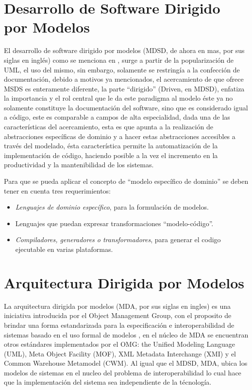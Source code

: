 \section{Desarrollo de Software Dirigido por Modelos}
\label{sec:mdsd}
El desarrollo de software dirigido por modelos (MDSD, de ahora en mas, por sus
siglas en inglés) como se menciona en \cite{mdsd} , surge a partir de la popularización de UML,
el uso del mismo, sin embargo, solamente se restringía a la confección de
documentación, debido a motivos ya mencionados, el acercamiento de que ofrece
MSDS es enteramente diferente, la parte ``dirigido'' (Driven, en MDSD),
enfatiza la importancia y el rol central que le da este paradigma al modelo
éste ya no solamente constituye
la documentación del software, sino que es considerado igual a código, este es
comparable a campos de alta especialidad, dada una de las características del
acercamiento, esta es que apunta a la realización de abstracciones específicas de
dominio y a hacer estas abstracciones accesibles a través del modelado, ésta
característica permite la automatización de la implementación de código,
haciendo posible a la vez el incremento en la productividad y la mantenibilidad
de los sistemas.

Para que se pueda aplicar el concepto de ``modelo específico de dominio'' se
deben tener en cuenta tres requerimientos:
\begin{itemize}
	\item \textit{Lenguajes de dominio específico}, para la formulación de modelos.
	\item Lenguajes que puedan expresar transformaciones ``modelo-código''.
	\item \textit{Compiladores, generadores o transformadores}, para generar el codigo
		ejecutable en varias plataformas.
\end{itemize}

\section{Arquitectura Dirigida por Modelos}
\label{sec:arquitectura_dirigida_por_modelos}
La arquitectura dirigida por modelos (MDA, por sus siglas en ingles) es una
iniciativa introducida por el Object Management Group, con el proposito de
brindar una forma estandarizada para la especificación e interoperabilidad de
sistemas basado en el uso formal de modelos \cite{poole2001}, en el núcleo de
MDA se encuentran otros estándares implementados por el OMG: the Unified
Modeling Language (UML), Meta Object Facility (MOF), XML Metadata Interchange
(XMI) y el Common Warehouse Metamodel (CWM). Al igual que el MDSD, MDA, ubica
los modelos de sistemas en el nucleo del problema de interoperabilidad lo cual
hace que la implementación del sistema sea independiente de la técnología.

